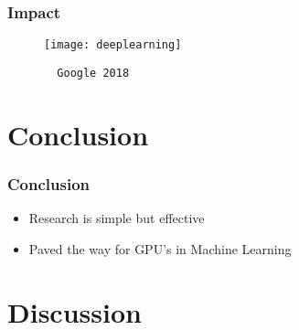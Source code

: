 \documentclass{beamer}
\begin{document}
\begin{frame}[fragile]
  \frametitle{Impact}

  \begin{figure}[h]
  \center
  \texttt{[image: deeplearning]}
  {\tiny
  \begin{verbatim}
  Google 2018
  \end{verbatim}
  }
  \end{figure}
\end{frame}

\section{Conclusion}

\begin{frame}
  \frametitle{Conclusion}

  \begin{itemize}
    \item Research is simple but effective
    \item Paved the way for GPU's in Machine Learning
  \end{itemize}
\end{frame}


\section{Discussion}
\end{document}
